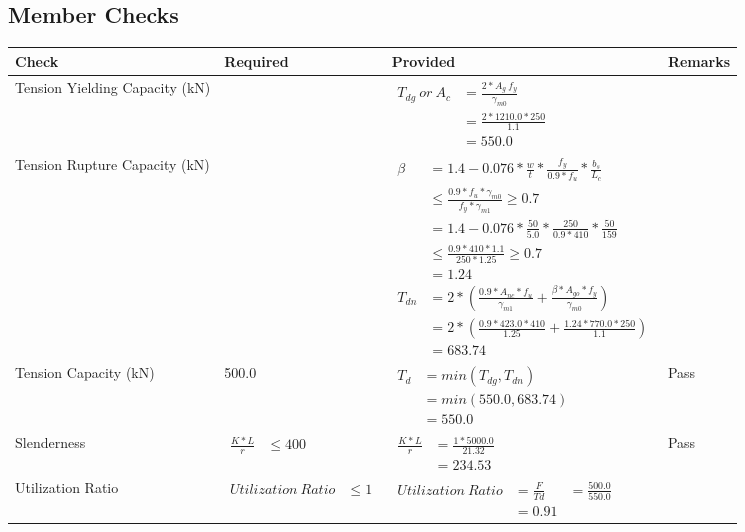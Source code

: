 \documentclass{article}%
\begin{document}
\subsection{Member Checks}%
\label{subsec:MemberChecks}%
\renewcommand{\arraystretch}{1.2}%
\begin{longtable}{|p{2.5cm}|p{4.5cm}|p{8cm}|p{1cm}|}%
\hline%
\rowcolor{OsdagGreen}%
Check&Required&Provided&Remarks\\%
\hline%
\endhead%
\hline%
Tension Yielding Capacity (kN)&&$\begin{aligned}T_{dg}~or~A_c&= \frac{2 * A_g ~ f_y}{\gamma_{m0}}\\ &= \frac{2*1210.0*250}{1.1}\\ &= 550.0\end{aligned}$&\\%
\hline%
Tension Rupture Capacity (kN)&&$\begin{aligned}\beta &= 1.4 - 0.076*\frac{w}{t}*\frac{f_{y}}{0.9*f_{u}}*\frac{b_s}{L_c}\\ &\leq\frac{0.9*f_{u}*\gamma_{m0}}{f_{y}*\gamma_{m1}} \geq 0.7 \\ &= 1.4 - 0.076*\frac{50}{5.0}*\frac{250}{0.9*410}*\frac{50}{159 }\\ &\leq\frac{0.9* 410*1.1}{250*1.25} \geq 0.7 \\ &= 1.24\\ T_{dn} &= 2*(\frac{0.9*A_{nc}*f_{u}}{\gamma_{m1}} + \frac{\beta * A_{go} * f_{y}}{\gamma_{m0}})\\ &= 2*(\frac{0.9* 423.0*410}{1.25} + \frac{1.24*770.0*250}{1.1})\\ &= 683.74\end{aligned}$&\\%
\hline%
Tension Capacity (kN)&500.0&$\begin{aligned} T_d &= min(T_{dg},T_{dn})\\ &= min(550.0,683.74)\\ &=550.0\end{aligned}$&Pass\\%
\hline%
Slenderness&$\begin{aligned}\frac{K * L}{r} &\leq 400\end{aligned}$&$\begin{aligned}\frac{K * L}{r} &= \frac{1*5000.0}{21.32}\\ &= 234.53\end{aligned}$&Pass\\%
\hline%
Utilization Ratio&$\begin{aligned} Utilization~Ratio &\leq 1 \end{aligned}$&$\begin{aligned} Utilization~Ratio &= \frac{F}{Td}&=\frac{500.0}{550.0}\\ &= 0.91\end{aligned}$&\\%

\end{longtable}
\end{document}
